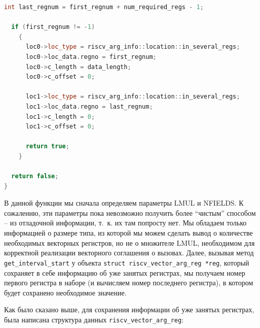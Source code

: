 \begin{samepage}
\begin{lstlisting}[language=C++, caption=Функция для выбора набора регистров для передачи аргумента, 
			   label=lst:func:riscv_assign_vec_reg_location, breaklines=false]
  int last_regnum = first_regnum + num_required_regs - 1;
   
  if (first_regnum != -1)
    {
      loc0->loc_type = riscv_arg_info::location::in_several_regs;
      loc0->loc_data.regno = first_regnum;
      loc0->c_length = data_length;
      loc0->c_offset = 0;

      loc1->loc_type = riscv_arg_info::location::in_several_regs;
      loc1->loc_data.regno = last_regnum;
      loc1->c_length = 0;
      loc1->c_offset = 0;
   
      return true;
    }
   
  return false;
}
\end{lstlisting}
\end{samepage}

В данной функции мы сначала определяем параметры LMUL и NFIELDS. К сожалению, эти параметры
пока невозможно получить более \enquote{чистым} способом -- из отладочной информации, т.~к. их там
попросту нет. Мы обладаем только информацией о размере типа, из которой мы можем сделать
вывод о количестве необходимых векторных регистров, но не о множителе LMUL, необходимом
для корректной реализации векторного соглашения о вызовах.
Далее, вызывая
метод \texttt{get\_interval\_start} у объекта \texttt{struct riscv\_vector\_arg\_reg *reg},
который сохраняет в себе информацию об уже занятых регистрах, мы получаем номер первого
регистра в наборе (и вычисляем номер последнего регистра), в котором будет сохранено 
необходимое значение.

Как было сказано выше, для сохранения информации об уже занятых регистрах, была
написана структура данных \texttt{riscv\_vector\_arg\_reg}:

